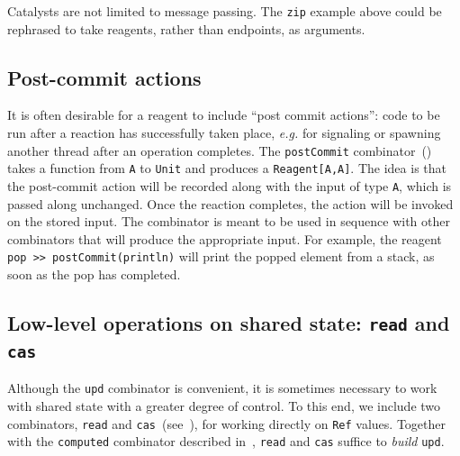 \documentclass[preprint,nocopyrightspace]{sigplanconf}
\begin{document}
Catalysts are not limited to message passing.  The \lstinline{zip} example
above could be rephrased to take reagents, rather than endpoints, as
arguments.  




\subsection{Post-commit actions}
\label{sec:postcommit}

It is often desirable for a reagent to include ``post commit actions'': code to
be run after a reaction has successfully taken place, \emph{e.g.} for signaling
or spawning another thread after an operation completes.  The
\lstinline{postCommit} combinator~() takes a function from
\lstinline{A} to \lstinline{Unit} and produces a \lstinline{Reagent[A,A]}.  The
idea is that the post-commit action will be recorded along with the input of
type \lstinline{A}, which is passed along unchanged.  Once the reaction
completes, the action will be invoked on the stored input.  The combinator is
meant to be used in sequence with other combinators that will produce the
appropriate input.  For example, the reagent
\lstinline{pop >> postCommit(println)} will print the popped element from a stack,
as soon as the pop has completed.

\subsection{Low-level operations on shared state: \lstinline{read} and \lstinline{cas}}
\label{sec:lowlevel}

Although the \lstinline{upd} combinator is convenient, it is sometimes necessary
to work with shared state with a greater degree of control.  To this end, we
include two combinators, \lstinline{read} and
\lstinline{cas}~(see~), for working directly on
\lstinline{Ref} values.  Together with the \lstinline{computed} combinator
described in~, \lstinline{read} and \lstinline{cas} suffice to
\emph{build} \lstinline{upd}.
\end{document}
